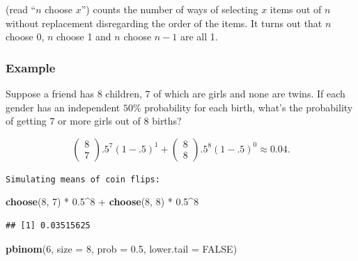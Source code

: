 \documentclass[]{article}
\newenvironment{Shaded}{\begin{snugshade}}{\end{snugshade}}
\newcommand{\KeywordTok}[1]{\textcolor[rgb]{0.13,0.29,0.53}{\textbf{{#1}}}}
\newcommand{\DataTypeTok}[1]{\textcolor[rgb]{0.13,0.29,0.53}{{#1}}}
\newcommand{\DecValTok}[1]{\textcolor[rgb]{0.00,0.00,0.81}{{#1}}}
\newcommand{\FloatTok}[1]{\textcolor[rgb]{0.00,0.00,0.81}{{#1}}}
\newcommand{\StringTok}[1]{\textcolor[rgb]{0.31,0.60,0.02}{{#1}}}
\newcommand{\OtherTok}[1]{\textcolor[rgb]{0.56,0.35,0.01}{{#1}}}
\newcommand{\NormalTok}[1]{{#1}}
\begin{document}
(read ``$n$ choose $x$'') counts the number of ways of selecting $x$
items out of $n$ without replacement disregarding the order of the
items. It turns out that $n$ choose 0, $n$ choose 1 and $n$ choose $n-1$
are all 1.

\subsubsection{Example}\label{example-10}

Suppose a friend has 8 children, $7$ of which are girls and none are
twins. If each gender has an independent $50$\% probability for each
birth, what's the probability of getting $7$ or more girls out of $8$
births?

\[
\left(
\begin{array}{c}
  8 \\ 7
\end{array}
\right) .5^{7}(1-.5)^{1}
+
\left(
\begin{array}{c}
  8 \\ 8
\end{array}
\right) .5^{8}(1-.5)^{0} \approx 0.04 .
\]

\vspace{1pc}

\verb;Simulating means of coin flips:;

\begin{Shaded}
\begin{Highlighting}[]
\KeywordTok{choose}\NormalTok{(}\DecValTok{8}\NormalTok{, }\DecValTok{7}\NormalTok{) *}\StringTok{ }\FloatTok{0.5}\NormalTok{^}\DecValTok{8} \NormalTok{+}\StringTok{ }\KeywordTok{choose}\NormalTok{(}\DecValTok{8}\NormalTok{, }\DecValTok{8}\NormalTok{) *}\StringTok{ }\FloatTok{0.5}\NormalTok{^}\DecValTok{8}
\end{Highlighting}
\end{Shaded}

\begin{verbatim}
## [1] 0.03515625
\end{verbatim}

\begin{Shaded}
\begin{Highlighting}[]
\KeywordTok{pbinom}\NormalTok{(}\DecValTok{6}\NormalTok{, }\DataTypeTok{size =} \DecValTok{8}\NormalTok{, }\DataTypeTok{prob =} \FloatTok{0.5}\NormalTok{, }\DataTypeTok{lower.tail =} \OtherTok{FALSE}\NormalTok{)}
\end{Highlighting}
\end{Shaded}
\end{document}
